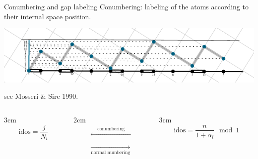 \documentclass[xcolor=x11names,compress,professionalfonts]{beamer}
\renewcommand{\(}{\begin{columns}}
\renewcommand{\)}{\end{columns}}
\newcommand{\<}[1]{\begin{column}{#1}}
\renewcommand{\>}{\end{column}}
\newcommand{\id}{\ensuremath{\text{idos}}}
\begin{document}
\begin{frame}{Conumbering and gap labeling}
Conumbering: labeling of the atoms according to their internal space position.

{  \centering
     \includegraphics[scale=.9]{img/cut_and_project_perp_projections.pdf}

}
{\flushright
\small{see Mosseri \& Sire 1990.}

}
\(
\<{3cm}
\[
	\id = \frac{j}{N_l}
\]
\>

\<{2cm}
\begin{align*}
	\xleftarrow[]{\text{~~~~conumbering~~~~}} \\
	\xrightarrow[\text{normal numbering}]{}
\end{align*}
\>

\<{3cm}
\[
	\id = \frac{n}{1+\alpha_l} \mod 1
\]
\>
\)

\end{frame}
\end{document}
